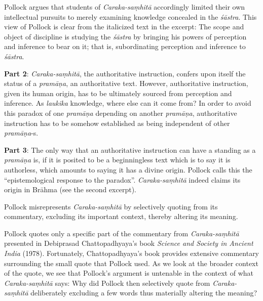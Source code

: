 \newpage

Pollock argues that students of {\sl Caraka-saṃhitā} accordingly limited their own intellectual pursuits to merely examining knowledge concealed in the {\sl śāstra}.  This view of Pollock is clear from the italicized text in the excerpt: The scope and object of discipline is studying the {\sl śāstra} by bringing his powers of perception and inference to bear on it; that is, subordinating perception and inference to {\sl śāstra}.

{\bf Part 2}: {\sl Caraka-saṃhitā}, the authoritative instruction, confers upon itself the status of a {\sl pramāṇa}, an authoritative text.  However, authoritative instruction, given its human  origin, has to be ultimately sourced from perception and inference.  As {\sl laukika} knowledge, where else can it come from? In order to avoid this paradox of one {\sl pramāṇa} depending on another {\sl pramāṇa}, authoritative instruction has to be somehow established as being independent of other {\sl pramāṇa}-s.

{\bf Part 3}: The only way that an authoritative instruction can have a standing as a {\sl pramāṇa} is, if it is posited to be a beginningless text which is to say it is authorless, which amounts to saying it has a divine origin.  Pollock calls this the ``epistemological response to the paradox''. {\sl Caraka-saṃhitā} indeed claims its origin in Brāhma (see the second excerpt).

Pollock misrepresents {{\sl Caraka-saṃhitā}\relax} by selectively quoting from its commentary, excluding its important context, thereby altering its meaning.

Pollock quotes only a specific part of the commentary from {\sl Caraka-saṃhitā} presented in Debiprasad Chattopadhyaya's book {\sl Science and Society in Ancient India} (1978).  Fortunately, Chattopadhyaya's book provides extensive commentary surrounding the small quote that Pollock used. As we look at the broader context of the quote, we see that Pollock's argument is untenable in the context of what {\sl Caraka-saṃhitā} says: Why did Pollock then selectively quote from {\sl Caraka-saṃhitā} deliberately excluding a few words thus materially altering the meaning?

